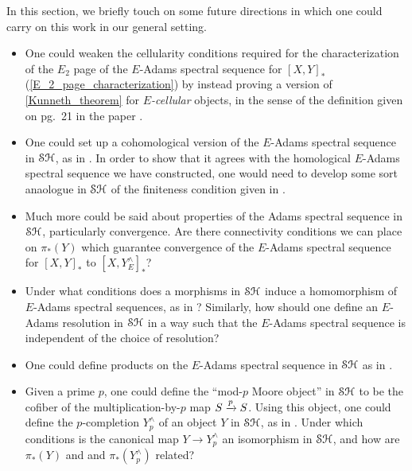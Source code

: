 \documentclass[../main.tex]{subfiles}
\begin{document}
In this section, we briefly touch on some future directions in which one could carry on this work in our general setting.

\begin{itemize}
    \item One could weaken the cellularity conditions required for the characterization of the $E_2$ page of the $E$-Adams spectral sequence for ${[X,Y]}_*$ (\autoref{E_2_page_characterization}) by instead proving a version of \autoref{Kunneth_theorem} for \emph{$E$-cellular} objects, in the sense of the definition given on pg.\ 21 in the paper \cite{DugIsak}.
    \item One could set up a cohomological version of the $E$-Adams spectral sequence in $\mathcal{SH}$, as in \cite[\S3]{DugIsak}. In order to show that it agrees with the homological $E$-Adams spectral sequence we have constructed, one would need to develop some sort anaologue in $\mathcal{SH}$ of the finiteness condition given in \cite[Definitions 2.11 \& 2.12]{DugIsak}.
    \item Much more could be said about properties of the Adams spectral sequence in $\mathcal{SH}$, particularly convergence. Are there connectivity conditions we can place on $\pi_{*}(Y)$ which guarantee convergence of the $E$-Adams spectral sequence for ${[X,Y]}_*$ to ${[X,Y^\wedge_E]}_*$?
    \item Under what conditions does a morphisms in $\mathcal{SH}$ induce a homomorphism of $E$-Adams spectral sequences, as in \cite[Proposition 11.4.1]{Rognes_SSeq}? Similarly, how should one define an $E$-Adams resolution in $\mathcal{SH}$ in a way such that the $E$-Adams spectral sequence is independent of the choice of resolution?
    \item One could define products on the $E$-Adams spectral sequence in $\mathcal{SH}$ as in \cite[Sections 11.7 \& 11.8]{Rognes_SSeq}.
    \item Given a prime $p$, one could define the  ``mod-$p$ Moore object'' in $\mathcal{SH}$ to be the cofiber of the multiplication-by-$p$ map $S\xrightarrow pS$. Using this object, one could define the $p$-completion $Y_p^\wedge$ of an object $Y$ in $\mathcal{SH}$, as in \cite[Definition 11.5.4]{Rognes_SSeq}. Under which conditions is the canonical map $Y\to Y_p^\wedge$ an isomorphism in $\mathcal{SH}$, and how are $\pi_*(Y)$ and and $\pi_*(Y^\wedge_p)$ related?

\end{itemize}
\end{document}
